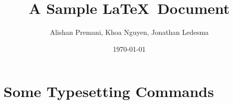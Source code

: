 

\title{A Sample \LaTeX ~Document}		%

\author{Alishan Premani, Khoa Nguyen, Jonathan Ledesma}					%

\date{\today}				%


\maketitle		%

\section{Some Typesetting Commands}		%
									
